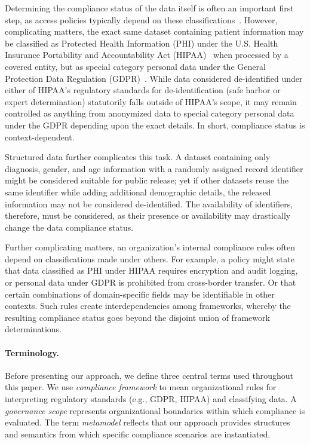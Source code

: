 \documentclass{IOS-Book-Article}
\begin{document}
Determining the compliance status of the data itself is often an important first step, as access policies typically depend on these classifications~\cite{xacml,nist-sp-800-95,nist-ir-7657}. However, complicating matters, the exact same dataset containing patient information may be classified as Protected Health Information (PHI) under the U.S. Health Insurance Portability and Accountability Act (HIPAA)~\cite{hipaa-privacy} when processed by a covered entity, but as special category personal data under the General Protection Data Regulation (GDPR)~\cite{gdpr}. While data considered de-identified under either of HIPAA's regulatory standards for de-identification (safe harbor or expert determination) statutorily falls outside of HIPAA's scope, it may remain controlled as anything from anonymized data to special category personal data under the GDPR depending upon the exact details. In short, compliance status is context-dependent.

Structured data further complicates this task. A dataset containing only diagnosis, gender, and age information with a randomly assigned record identifier might be considered suitable for public release; yet if other datasets reuse the same identifier while adding additional demographic details, the released information may not be considered de-identified. The availability of identifiers, therefore, must be considered, as their presence or availability may drastically change the data compliance status.

Further complicating matters, an organization's internal compliance rules often depend on classifications made under others. For example, a policy might state that data classified as PHI under HIPAA requires encryption and audit logging, or personal data under GDPR is prohibited from cross-border transfer. Or that certain combinations of domain-specific fields may be identifiable in other contexts. Such rules create interdependencies among frameworks, whereby the resulting compliance status goes beyond the disjoint union of framework determinations.

\paragraph{Terminology.}
Before presenting our approach, we define three central terms used throughout this paper. We use \emph{compliance framework} to mean organizational rules for interpreting regulatory standards (e.g., GDPR, HIPAA) and classifying data. A \emph{governance scope} represents organizational boundaries within which compliance is evaluated. The term \emph{metamodel} reflects that our approach provides structures and semantics from which specific compliance scenarios are instantiated.
\end{document}
